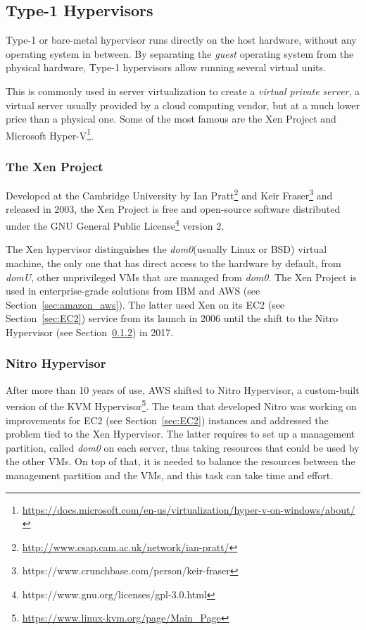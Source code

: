 \subsection{Type-1 Hypervisors}
\label{sub:type1hypervisor}
Type-1 or bare-metal hypervisor runs directly on the host hardware, without any operating system in between.
By separating the \textit{guest} operating system from the physical hardware, Type-1 hypervisors allow running 
several virtual units.  

This is commonly used in server virtualization to create a
\textit{virtual private server}, a virtual server usually provided by
a cloud computing vendor, but at a much lower price than a physical
one.  Some of the most famous are the Xen Project and Microsoft
Hyper-V\footnote{\url{https://docs.microsoft.com/en-us/virtualization/hyper-v-on-windows/about/}}.


\subsubsection{The Xen Project}
\label{subsubsec:xen}
Developed at the Cambridge University by Ian
Pratt\footnote{\url{http://www.csap.cam.ac.uk/network/ian-pratt/}} and
Keir Fraser\footnote{https://www.crunchbase.com/person/keir-fraser}
and released in 2003, the Xen Project is free and open-source software
distributed under the GNU General Public
License\footnote{https://www.gnu.org/licenses/gpl-3.0.html} version 2.

The Xen hypervisor distinguishes the \textit{dom0}(usually Linux or
BSD) virtual machine, the only one that has direct access to the
hardware by default, from \textit{domU}, other unprivileged VMs that
are managed from \textit{dom0}.  The Xen Project is used in
enterprise-grade solutions from IBM and AWS (see Section~\ref{sec:amazon_aws}). The
latter used Xen on its EC2 (see Section~\ref{sec:EC2}) service from its launch in
2006 until the shift to the Nitro Hypervisor (see Section~\ref{subsubsec:nitro}) in
2017.

\subsubsection{Nitro Hypervisor}
\label{subsubsec:nitro}
After more than 10 years of use, AWS shifted to Nitro Hypervisor, a
custom-built version of the KVM
Hypervisor\footnote{\url{https://www.linux-kvm.org/page/Main_Page}}.
The team that developed Nitro\cite{awsNitro} was working on
improvements for EC2 (see Section~\ref{sec:EC2}) instances and
addressed the problem tied to the Xen Hypervisor.  The latter requires
to set up a management partition, called \textit{dom0} on each server,
thus taking resources that could be used by the other VMs.  On top of
that, it is needed to balance the resources between the management
partition and the VMs, and this task can take time and effort.

